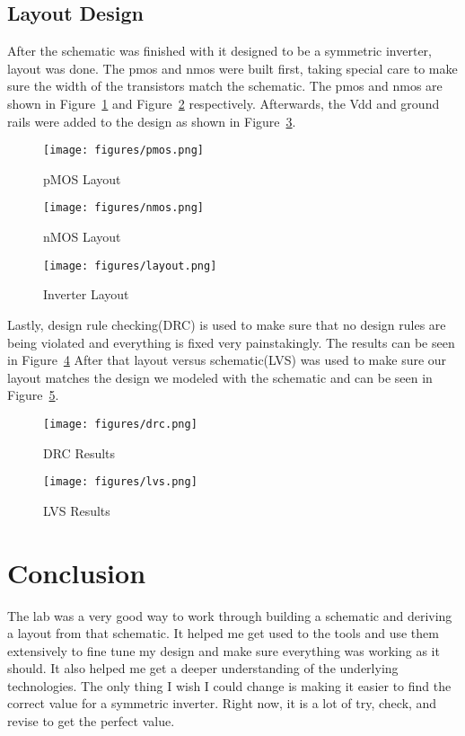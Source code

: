 \documentclass[12pt]{article}
\begin{document}
\subsection{Layout Design}
After the schematic was finished with it designed to be a symmetric inverter, layout was done. The pmos and nmos were built first, taking special care to make sure the width of the transistors match the schematic. The pmos and nmos are shown in Figure~\ref{fig:pmos} and Figure~\ref{fig:nmos} respectively. Afterwards, the Vdd and ground rails were added to the design as shown in Figure~\ref{fig:inverter_layout}.
\begin{figure}[!htb]
  \centering
  \texttt{[image: figures/pmos.png]}
  \caption{pMOS Layout}\label{fig:pmos}
\end{figure}
\begin{figure}[!htb]
  \centering
  \texttt{[image: figures/nmos.png]}
  \caption{nMOS Layout}\label{fig:nmos}
\end{figure}
\begin{figure}[!htb]
  \centering
  \texttt{[image: figures/layout.png]}
  \caption{Inverter Layout}\label{fig:inverter_layout}
\end{figure}
Lastly, design rule checking(DRC) is used to make sure that no design rules are being violated and everything is fixed very painstakingly. The results can be seen in Figure~\ref{fig:drc}  After that layout versus schematic(LVS) was used to make sure our layout matches the design we modeled with the schematic and can be seen in Figure~\ref{fig:lvs}.
\begin{figure}[!htb]
  \centering
  \texttt{[image: figures/drc.png]}
  \caption{DRC Results}\label{fig:drc}
\end{figure}
\begin{figure}[!htb]
  \centering
  \texttt{[image: figures/lvs.png]}
  \caption{LVS Results}\label{fig:lvs}
\end{figure}
\section{Conclusion}
The lab was a very good way to work through building a schematic and deriving a layout from that schematic. It helped me get used to the tools and use them extensively to fine tune
my design and make sure everything was working as it should. It also helped me get a deeper understanding of the underlying technologies. The only thing I wish I could change is
making it easier to find the correct value for a symmetric inverter. Right now, it is a lot of try, check, and revise to get the perfect value.
\end{document}
